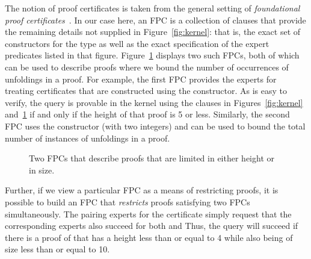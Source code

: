 {\color{red}}
The notion of proof certificates
 is taken from the general setting of \emph{foundational
  proof certificates}~\cite{chihani17jar}.
%
In our case here, an FPC is a collection of \lP clauses that
provide the remaining details not supplied in Figure~\ref{fig:kernel}:
that is, the exact set of constructors for the  type as
well as the exact specification of the expert predicates listed in
that figure.
%
Figure~\ref{fig:resources} displays two such FPCs,
both of which can be used to describe proofs where we bound
the number of occurrences of unfoldings in a proof.
%
For example, the first FPC
provides the experts for treating certificates that are constructed
using the  constructor.
%
As is easy to verify, the query \mbox{} is
provable in  the kernel using the clauses in Figures~\ref{fig:kernel}
and~\ref{fig:resources} if and only if the height of that proof is 5
or less.
%
Similarly, the second FPC uses the constructor  (with two
integers) and can be used to bound the total number of instances of
unfoldings in a proof.
%

\begin{figure}


\caption{Two FPCs that describe proofs that are limited in either
  height or in size.}
\label{fig:resources}
\end{figure}


Further, if we view a particular FPC as a means of restricting proofs, it is
possible to build an FPC that \emph{restricts} proofs satisfying two FPCs
simultaneously.
%
%
The pairing experts for the certificate  simply
request that the corresponding experts also succeed for both
 and  
%
Thus, the query 
will succeed if there is a proof of  that has a height less
than or equal to 4 while also being of size less than or equal to 10.

